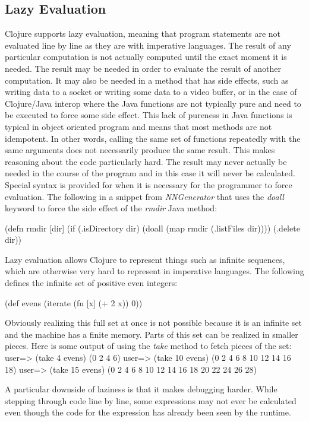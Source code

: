 \subsection{Lazy Evaluation}
Clojure supports lazy evaluation, meaning that program statements are not
evaluated line by line as they are with imperative languages. 
The result of any particular computation is not actually computed until the
exact moment it is needed.
The result may be needed in order to evaluate the result of another computation. 
It may also be needed in a method that has side effects, such as
writing data to a socket or writing some data to a video buffer, or in
the case of Clojure/Java interop where the Java functions are not
typically pure and need to be executed to force some side effect.
This lack of pureness in Java functions is typical in object oriented
program and means that most methods are not idempotent.
In other words, calling the same set of functions repeatedly with the
same arguments does not necessarily produce the same result.
This makes reasoning about the code particularly hard.
The result may never actually be needed in the course of the program
and in this case it will never be calculated.
Special syntax is provided for when it is necessary for the programmer
to force
evaluation. The following in a snippet from {\em NNGenerator} that
uses the {\it doall} keyword to force the side effect of the {\it rmdir} Java method: 

(defn rmdir [dir]
  (if (.isDirectory dir)
      (doall (map rmdir (.listFiles dir))))
  (.delete dir))

Lazy evaluation allows Clojure to represent things such as infinite sequences,
which are otherwise very hard to represent in imperative languages. 
The following defines the infinite set of positive even integers: 

(def evens (iterate (fn [x] (+ 2 x)) 0))

Obviously realizing this full set at once is not possible because it
is an infinite set and the machine has a finite memory.
Parts of this set can be realized in smaller pieces. Here is some
output of using the {\it take} method to fetch pieces of the set: 
user=> (take 4 evens)
(0 2 4 6)
user=> (take 10 evens)
(0 2 4 6 8 10 12 14 16 18)
user=> (take 15 evens)
(0 2 4 6 8 10 12 14 16 18 20 22 24 26 28)

A particular downside of laziness is that it makes debugging harder. 
While stepping through code line by line, some expressions may not
ever be calculated even though the code for the expression has already
been seen by the runtime.

